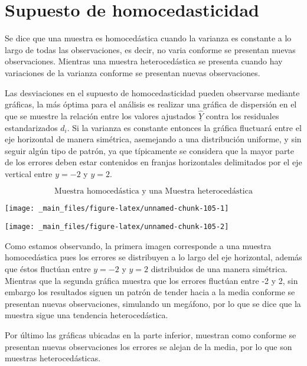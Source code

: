 \documentclass[
  a4paper,
  oneside,
  openany]{book}
\begin{document}
\hypertarget{supuesto-de-homocedasticidad}{%
\section{Supuesto de homocedasticidad}\label{supuesto-de-homocedasticidad}}

Se dice que una muestra es homocedástica cuando la varianza es constante a lo largo de todas las observaciones, es decir, no varia conforme se presentan nuevas observaciones. Mientras una muestra heterocedástica se presenta cuando hay variaciones de la varianza conforme se presentan nuevas observaciones.

Las desviaciones en el supuesto de homocedasticidad pueden observarse mediante gráficas, la más óptima para el análisis es realizar una gráfica de dispersión en el que se muestre la relación entre los valores ajustados \(\underline{\hat{Y}}\) contra los residuales estandarizados \(d_{i}\). Si la varianza es constante entonces la gráfica fluctuará entre el eje horizontal de manera simétrica, asemejando a una distribución uniforme, y sin seguir algún tipo de patrón, ya que típicamente se considera que la mayor parte de los errores deben estar contenidos en franjas horizontales delimitados por el eje vertical entre \(y=-2\) y \(y=2\).

\[\mbox{Muestra homocedástica y una Muestra heterocedástica}\]

\begin{center}\texttt{[image: \_main\_files/figure-latex/unnamed-chunk-105-1]} \end{center}

\begin{center}\texttt{[image: \_main\_files/figure-latex/unnamed-chunk-105-2]} \end{center}

Como estamos observando, la primera imagen corresponde a una muestra homocedástica pues los errores se distribuyen a lo largo del eje horizontal, además que éstos fluctúan entre \(y=-2\) y \(y=2\) distribuidos de una manera simétrica. Mientras que la segunda gráfica muestra que los errores fluctúan entre -2 y 2, sin embargo los resultados siguen un patrón de tender hacia a la media conforme se presentan nuevas observaciones, simulando un megáfono, por lo que se dice que la muestra sigue una tendencia heterocedástica.

Por último las gráficas ubicadas en la parte inferior, muestran como conforme se presentan nuevas observaciones los errores se alejan de la media, por lo que son muestras heterocedásticas.
\end{document}
